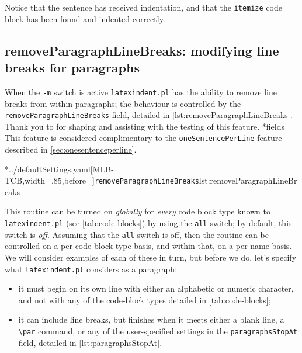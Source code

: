 
	Notice that the sentence has received indentation, and that the
	\texttt{itemize} code block has been found and indented correctly.

\subsection{removeParagraphLineBreaks: modifying line breaks for paragraphs}\label{subsec:removeparagraphlinebreaks}
	When the \texttt{-m} switch is active \texttt{latexindent.pl} has the
	ability to remove line breaks%
	 from within paragraphs; the behaviour is controlled by the
	\texttt{removeParagraphLineBreaks} field, detailed in \cref{lst:removeParagraphLineBreaks}. Thank you to
	\cite{jowens} for shaping and assisting with the testing of this feature.
*{fields}
	This feature is considered complimentary to the \texttt{oneSentencePerLine} feature
	described in \vref{sec:onesentenceperline}.

	\cmhlistingsfromfile[style=removeParagraphLineBreaks]*{../defaultSettings.yaml}[MLB-TCB,width=.85\linewidth,before=\centering]{\texttt{removeParagraphLineBreaks}}{lst:removeParagraphLineBreaks}

	This routine can be turned on \emph{globally} for \emph{every}
	code block type known to \texttt{latexindent.pl}
	(see \vref{tab:code-blocks}) by using the
	\texttt{all} switch; by default, this switch is
	\emph{off}. Assuming that the \texttt{all} switch is off,
	then the routine can be controlled on a per-code-block-type basis, and within that, on a
	per-name basis. We will consider examples of each of these in turn, but before we do,
	let's specify what \texttt{latexindent.pl} considers as a paragraph:
	\begin{itemize}
		\item it must begin on its own line with either an alphabetic or numeric character, and not
		      with any of the code-block types detailed in \vref{tab:code-blocks};
		\item it can include line breaks, but finishes when it meets either a blank line, a
		      \lstinline!\par! command, or any of the user-specified settings in the
		      \texttt{paragraphsStopAt} field, detailed in \vref{lst:paragraphsStopAt}.
	\end{itemize}

